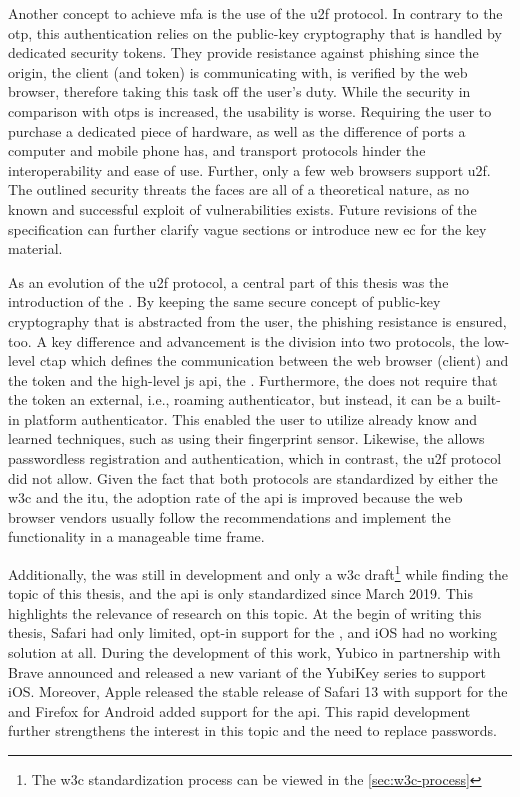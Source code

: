 Another concept to achieve \gls{mfa} is the use of the \gls{u2f} protocol. In contrary to the \gls{otp}, this authentication relies on the public-key cryptography that is handled by dedicated security tokens. They provide resistance against phishing since the origin, the client (and token) is communicating with, is verified by the web browser, therefore taking this task off the user's duty. While the security in comparison with \glspl{otp} is increased, the usability is worse. Requiring the user to purchase a dedicated piece of hardware, as well as the difference of ports a computer and mobile phone has, and transport protocols hinder the interoperability and ease of use. Further, only a few web browsers support \gls{u2f}. The outlined security threats the \wa{} faces are all of a theoretical nature, as no known and successful exploit of vulnerabilities exists. Future revisions of the specification can further clarify vague sections or introduce new \gls{ec} for the key material.

As an evolution of the \gls{u2f} protocol, a central part of this thesis was the introduction of the \wa. By keeping the same secure concept of public-key cryptography that is abstracted from the user, the phishing resistance is ensured, too. A key difference and advancement is the division into two protocols, the low-level \gls{ctap} which defines the communication between the web browser (client) and the token and the high-level \gls{js} \gls{api}, the \wa{}. Furthermore, the \wa{} does not require that the token an external, i.e., roaming authenticator, but instead, it can be a built-in platform authenticator. This enabled the user to utilize already know and learned techniques, such as using their fingerprint sensor. Likewise, the \wa{} allows passwordless registration and authentication, which in contrast, the \gls{u2f} protocol did not allow. Given the fact that both protocols are standardized by either the \gls{w3c} and the \gls{itu}, the adoption rate of the \gls{api} is improved because the web browser vendors usually follow the recommendations and implement the functionality in a manageable time frame. 

\newpage

Additionally, the \wa{} was still in development and only a \gls{w3c} draft\footnote{The \gls{w3c} standardization process can be viewed in the \autoref{sec:w3c-process}} while finding the topic of this thesis, and the \gls{api} is only standardized since March 2019. This highlights the relevance of research on this topic. At the begin of writing this thesis, Safari had only limited, opt-in support for the \wa, and iOS had no working solution at all. During the development of this work, Yubico in partnership with Brave announced and released a new variant of the YubiKey series to support iOS. Moreover, Apple released the stable release of Safari 13 with support for the \wa{} and Firefox for Android added support for the \gls{api}. This rapid development further strengthens the interest in this topic and the need to replace passwords. 

